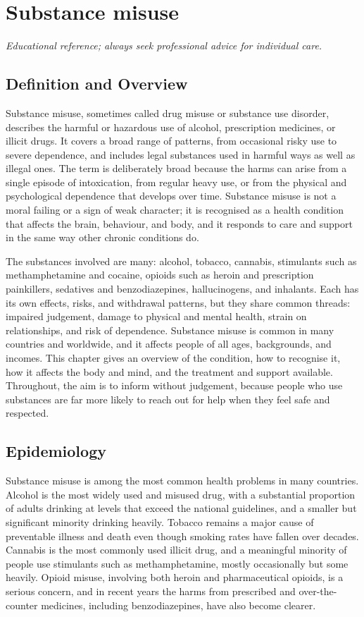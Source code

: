 \chapter{Substance misuse}

\medskip
\noindent\textit{Educational reference; always seek professional advice for individual care.}

\section*{Definition and Overview}
Substance misuse, sometimes called drug misuse or substance use disorder, describes the harmful or hazardous use of alcohol, prescription medicines, or illicit drugs. It covers a broad range of patterns, from occasional risky use to severe dependence, and includes legal substances used in harmful ways as well as illegal ones. The term is deliberately broad because the harms can arise from a single episode of intoxication, from regular heavy use, or from the physical and psychological dependence that develops over time. Substance misuse is not a moral failing or a sign of weak character; it is recognised as a health condition that affects the brain, behaviour, and body, and it responds to care and support in the same way other chronic conditions do.

The substances involved are many: alcohol, tobacco, cannabis, stimulants such as methamphetamine and cocaine, opioids such as heroin and prescription painkillers, sedatives and benzodiazepines, hallucinogens, and inhalants. Each has its own effects, risks, and withdrawal patterns, but they share common threads: impaired judgement, damage to physical and mental health, strain on relationships, and risk of dependence. Substance misuse is common in many countries and worldwide, and it affects people of all ages, backgrounds, and incomes. This chapter gives an overview of the condition, how to recognise it, how it affects the body and mind, and the treatment and support available. Throughout, the aim is to inform without judgement, because people who use substances are far more likely to reach out for help when they feel safe and respected.

\section*{Epidemiology}
Substance misuse is among the most common health problems in many countries. Alcohol is the most widely used and misused drug, with a substantial proportion of adults drinking at levels that exceed the national guidelines, and a smaller but significant minority drinking heavily. Tobacco remains a major cause of preventable illness and death even though smoking rates have fallen over decades. Cannabis is the most commonly used illicit drug, and a meaningful minority of people use stimulants such as methamphetamine, mostly occasionally but some heavily. Opioid misuse, involving both heroin and pharmaceutical opioids, is a serious concern, and in recent years the harms from prescribed and over-the-counter medicines, including benzodiazepines, have also become clearer.

